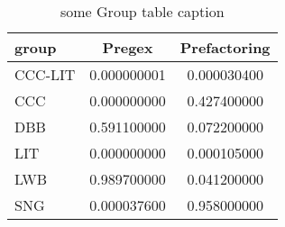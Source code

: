 \begin{table*}\begin{small}\begin{center}\caption{some Group table caption}\label{table:groupANOVATable}\begin{tabular}
{lcc}
group & Pregex & Prefactoring \\
\toprule[0.16em]
CCC-LIT & 0.000000001 & 0.000030400\\
CCC & 0.000000000 & 0.427400000\\
DBB & 0.591100000 & 0.072200000\\
LIT & 0.000000000 & 0.000105000\\
LWB & 0.989700000 & 0.041200000\\
SNG & 0.000037600 & 0.958000000\\
\bottomrule[0.13em]\end{tabular}\end{center}\end{small}\end{table*}
